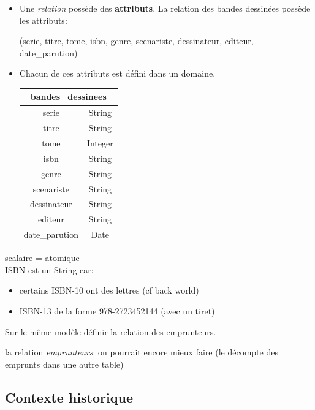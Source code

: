 \documentclass[a4paper,11pt]{article}
\begin{document}
\begin{Form}
\begin{itemize}
\begin{center}
\end{center}
\item Une \emph{relation} possède des \textbf{attributs}. La relation des bandes dessinées possède les attributs:
\begin{center}
(serie, titre, tome, isbn, genre, scenariste, dessinateur, editeur, date\_parution)
\end{center}
\item Chacun de ces attributs est défini dans un domaine.
\begin{center}
\begin{tabular}{|cc|}
\hline 
\multicolumn{2}{|c|}{bandes\_dessinees} \\ 
\hline 
serie & String \\ 
titre & String \\ 
tome & Integer \\ 
isbn & String \\ 
genre & String \\ 
scenariste & String \\ 
dessinateur & String \\ 
editeur & String \\ 
date\_parution & Date \\ 
\hline 
\end{tabular} 
\end{center}
\end{itemize}
\begin{commentprof}
scalaire = atomique\\
ISBN est un String car:
\begin{itemize}
\item certains ISBN-10 ont des lettres (cf back world)
\item ISBN-13 de la forme 978-2723452144 (avec un tiret)
\end{itemize}
\end{commentprof}
\begin{activite}
Sur le même modèle définir la relation des emprunteurs.
\end{activite}
\begin{commentprof}
la relation \emph{emprunteurs}: on pourrait encore mieux faire (le décompte des emprunts dans une autre table)
\subsection*{Contexte historique}

\end{commentprof}

\end{Form}
\end{document}
